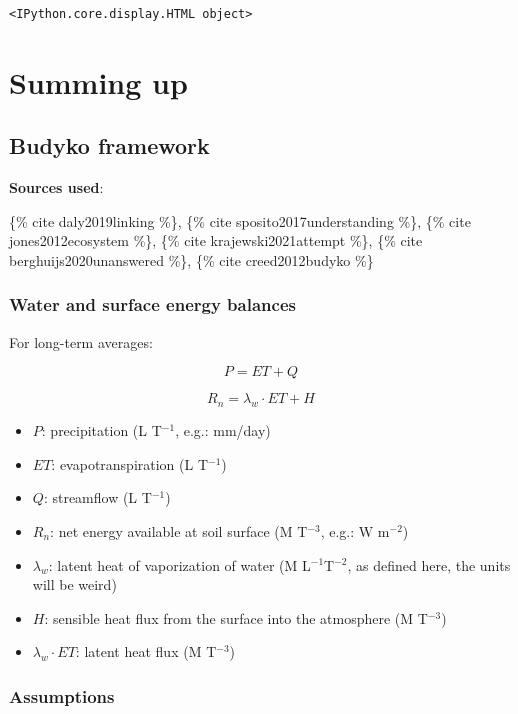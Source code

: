 \documentclass[
  letterpaper,
  DIV=11,
  numbers=noendperiod]{scrreprt}
\providecommand{\tightlist}{%
  \setlength{\itemsep}{0pt}\setlength{\parskip}{0pt}}\usepackage{longtable,booktabs,array}
\begin{document}
\begin{verbatim}
<IPython.core.display.HTML object>
\end{verbatim}

\part{Summing up}

\hypertarget{budyko-framework}{%
\chapter{Budyko framework}\label{budyko-framework}}

\textbf{Sources used}:

\{\% cite daly2019linking \%\}, \{\% cite sposito2017understanding \%\},
\{\% cite jones2012ecosystem \%\}, \{\% cite krajewski2021attempt \%\},
\{\% cite berghuijs2020unanswered \%\}, \{\% cite creed2012budyko \%\}

\hypertarget{water-and-surface-energy-balances}{%
\section{Water and surface energy
balances}\label{water-and-surface-energy-balances}}

For long-term averages:

\[
P = ET+Q
\]

\[
R_n = \lambda_w\cdot ET + H
\]

\begin{itemize}
\tightlist
\item
  \(P\): precipitation (L T\(^{-1}\), e.g.: mm/day)
\item
  \(ET\): evapotranspiration (L T\(^{-1}\))
\item
  \(Q\): streamflow (L T\(^{-1}\))
\item
  \(R_n\): net energy available at soil surface (M T\(^{-3}\), e.g.: W
  m\(^{-2}\))
\item
  \(\lambda_w\): latent heat of vaporization of water (M
  L\(^{-1}\)T\(^{-2}\), as defined here, the units will be weird)
\item
  \(H\): sensible heat flux from the surface into the atmosphere (M
  T\(^{-3}\))
\item
  \(\lambda_w \cdot ET\): latent heat flux (M T\(^{-3}\))
\end{itemize}

\hypertarget{assumptions}{%
\section{Assumptions}\label{assumptions}}
\end{document}

